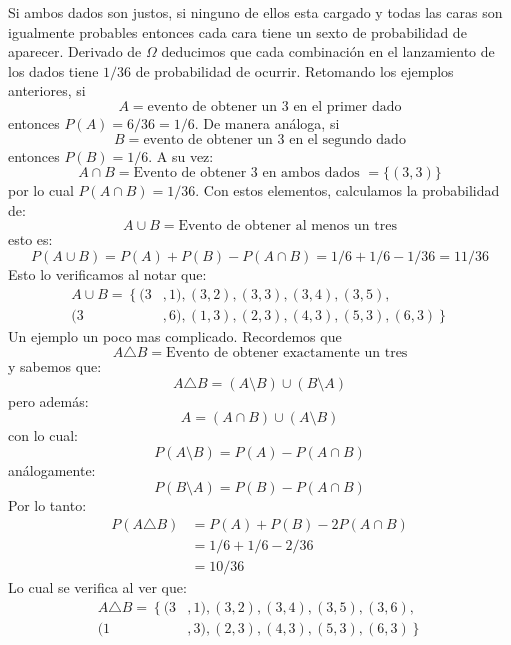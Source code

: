 \documentclass[14pt]{extreport}
\newcounter{ejemplo}[chapter]
\begin{document}
Si ambos dados son justos, si ninguno de ellos esta cargado y todas las caras son igualmente probables entonces cada cara tiene un sexto de probabilidad de aparecer. Derivado de $\Omega$ deducimos que cada combinación en el lanzamiento de los dados tiene $1/36$ de probabilidad de ocurrir. Retomando los ejemplos anteriores, si 
$$
A = \text{evento de obtener un 3 en el primer dado}
$$ 
entonces $P(A) = 6/36 = 1/6$. De manera análoga, si 
$$
B = \text{evento de obtener un 3 en el segundo dado}
$$ 
entonces $P(B) = 1/6$. A su vez: 
$$
A \cap B = \text{Evento de obtener 3 en ambos dados } = \{(3, 3)\}
$$
por lo cual $P(A \cap B) = 1/36$. Con estos elementos, calculamos la
probabilidad de:
$$
A \cup B = \text{Evento de obtener al menos un tres}
$$
esto es: 
$$
P(A \cup B) = P(A) + P(B) - P(A \cap B) =  1/6 + 1/ 6 - 1/36 = 11/36
$$
Esto lo verificamos al notar que: 
\begin{equation*}
    \begin{split}
        A \cup B = \left\{\right.(3&, 1), (3, 2), (3, 3), (3,4), (3, 5),\\
                                 (3&, 6), (1, 3), (2, 3), (4, 3), (5, 3), (6, 3)\left.\right\}
    \end{split}
\end{equation*}
Un ejemplo un poco mas complicado. Recordemos que 
$$
A \triangle B = \text{Evento de obtener exactamente un tres}
$$
y sabemos que:
$$
A \triangle B = (A \setminus B) \cup (B \setminus A)
$$
pero además:
$$
A = (A \cap B) \cup (A \setminus B)
$$
con lo cual: 
$$
P(A \setminus B) = P(A) - P(A \cap B)
$$
análogamente:
$$
P(B \setminus A) = P(B) - P(A \cap B)
$$
Por lo tanto: 
\begin{equation*}
    \begin{split}
        P(A \triangle B) & = P(A) + P(B) - 2P(A \cap B) \\
                         & = 1/6 + 1/6 -2/36 \\
                         & = 10/36
    \end{split}
\end{equation*}
Lo cual se verifica al ver que: 
\begin{equation*}
    \begin{split}
        A \triangle B = \left\{\right. (3&, 1), (3, 2),(3, 4), (3, 5), (3, 6),\\
                                       (1&, 3), (2, 3), (4, 3), (5, 3), (6, 3)\left.\right\}
    \end{split}
\end{equation*}
\end{document}
